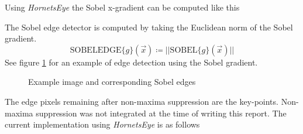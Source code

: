 \documentclass[a4paper,12pt]{book}
\begin{document}
Using \emph{HornetsEye} the Sobel x-gradient can be computed like this
\begin{scriptsize}
  
\end{scriptsize}

The Sobel edge detector is computed by taking the Euclidean norm of the Sobel
gradient.
\begin{equation*}
  \mathrm{SOBELEDGE}\{g\}(\vec{x})\coloneqq||\mathrm{SOBEL}\{g\}(\vec{x})||
\end{equation*}
See figure \ref{fig:sobel} for an example of edge detection using the
Sobel gradient.
\begin{figure}[htbp]
   \begin{center}
     \begin{minipage}[c]{.45\textwidth}
     \end{minipage}
     \begin{minipage}[c]{.45\textwidth}
     \end{minipage}
     \caption{Example image and corresponding Sobel edges\label{fig:sobel}}
   \end{center}
\end{figure}
The edge pixels remaining after non-maxima suppression are the
key-points. Non-maxima suppression was not integrated at the time of writing
this report. %
The current implementation using \emph{HornetsEye} is as follows
\begin{scriptsize}
  
\end{scriptsize}
\end{document}
